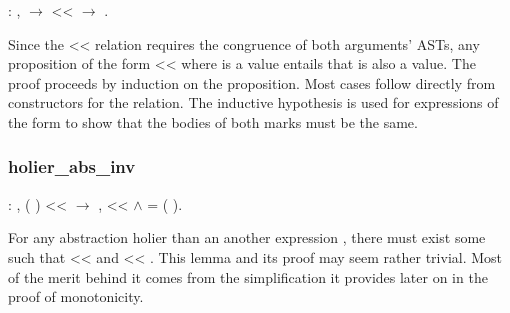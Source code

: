 \documentclass[12pt]{report}
\begin{document}
\begin{coqdoccode}
\coqdocemptyline
\coqdocindent{1.00em}
  : \coqdockw{\ensuremath{\forall}}  ,\coqdoceol
\coqdocindent{2.00em}
  \ensuremath{\rightarrow}\coqdoceol
\coqdocindent{2.00em}
 <<  \ensuremath{\rightarrow}\coqdoceol
\coqdocindent{2.00em}
 .\coqdoceol
\coqdocemptyline
\end{coqdoccode}
Since the << relation requires the congruence of both
arguments' ASTs, any proposition of the form  <<  where  is
a value entails that  is also a value.  The proof proceeds by
induction on the  proposition. Most cases follow directly from
constructors for the  relation. The inductive hypothesis is
used for expressions of the form    to show that the
bodies of both marks must be the same. 

\subsubsection{holier\_abs\_inv}

\begin{coqdoccode}
\coqdocemptyline
\coqdocindent{1.00em}
  : \coqdockw{\ensuremath{\forall}}    ,\coqdoceol
\coqdocindent{2.00em}
(   ) <<  \ensuremath{\rightarrow}\coqdoceol
\coqdocindent{2.00em}
\coqdoctac{\ensuremath{\exists}} ,  <<  \ensuremath{\land}  = (   ).\coqdoceol
\coqdocemptyline
\end{coqdoccode}
For any abstraction     holier than an another
expression , there must exist some  such that  <<
 and     <<    . This lemma and its
proof may seem rather trivial. Most of the merit behind it comes from
the simplification it provides later on in the proof of
monotonicity.
\end{document}
